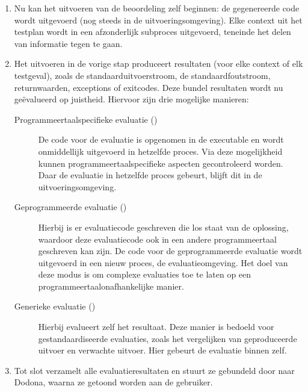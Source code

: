 \begin{enumerate}
    Bij geïnterpreteerde programmeertalen wordt deze stap overgeslagen.
    \item Nu kan het uitvoeren van de beoordeling zelf beginnen: de gegenereerde code wordt uitgevoerd (nog steeds in de uitvoeringsomgeving).
    Elke context uit het testplan wordt in een afzonderlijk subproces uitgevoerd, teneinde het delen van informatie tegen te gaan.
    \item Het uitvoeren in de vorige stap produceert resultaten (voor elke context of elk testgeval), zoals de standaarduitvoerstroom, de standaardfoutstroom, returnwaarden, exceptions of exitcodes.
    Deze bundel resultaten wordt nu geëvalueerd op juistheid.
    Hiervoor zijn drie mogelijke manieren:
    \begin{description}
        \item[Programmeertaalspecifieke evaluatie ()]
        De code voor de evaluatie is opgenomen in de executable en wordt onmiddellijk uitgevoerd in hetzelfde proces.
        Via deze mogelijkheid kunnen programmeertaalspecifieke aspecten gecontroleerd worden.
        Daar de evaluatie in hetzelfde proces gebeurt, blijft dit in de uitvoeringsomgeving.
        \item[Geprogrammeerde evaluatie ()]
        Hierbij is er evaluatiecode geschreven die los staat van de oplossing, waardoor deze evaluatiecode ook in een andere programmeertaal geschreven kan zijn.
        De code voor de geprogrammeerde evaluatie wordt uitgevoerd in een nieuw proces, de evaluatieomgeving.
        Het doel van deze modus is om complexe evaluaties toe te laten op een programmeertaalonafhankelijke manier.
        \item[Generieke evaluatie ()]
        Hierbij evalueert \tested{} zelf het resultaat.
        Deze manier is bedoeld voor gestandaardiseerde evaluaties, zoals het vergelijken van geproduceerde uitvoer en verwachte uitvoer.
        Hier gebeurt de evaluatie binnen \tested{} zelf.
    \end{description}
    \item Tot slot verzamelt \tested{} alle evaluatieresultaten en stuurt ze gebundeld door naar Dodona, waarna ze getoond worden aan de gebruiker.
\end{enumerate}

